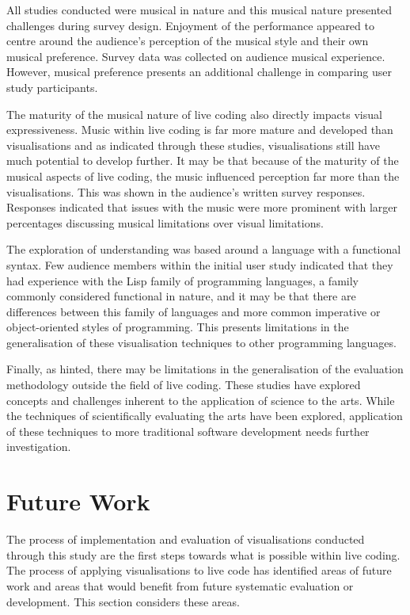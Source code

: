 All studies conducted were musical in nature and this musical nature presented challenges during survey design. Enjoyment of the performance appeared to centre around the audience's perception of the musical style and their own musical preference. Survey data was collected on audience musical experience. However, musical preference presents an additional challenge in comparing user study participants.

The maturity of the musical nature of live coding also directly impacts visual expressiveness. Music within live coding is far more mature and developed than visualisations and as indicated through these studies, visualisations still have much potential to develop further. It may be that because of the maturity of the musical aspects of live coding, the music influenced perception far more than the visualisations. This was shown in the audience's written survey responses. Responses indicated that issues with the music were more prominent with larger percentages discussing musical limitations over visual limitations.

The exploration of understanding was based around a language with a functional syntax. Few audience members within the initial user study indicated that they had experience with the Lisp family of programming languages, a family commonly considered functional in nature, and it may be that there are differences between this family of languages and more common imperative or object-oriented styles of programming. This presents limitations in the generalisation of these visualisation techniques to other programming languages.

Finally, as hinted, there may be limitations in the generalisation of the evaluation methodology outside the field of live coding. These studies have explored concepts and challenges inherent to the application of science to the arts. While the techniques of scientifically evaluating the arts have been explored, application of these techniques to more traditional software development needs further investigation.

\section{Future Work}

The process of implementation and evaluation of visualisations conducted through this study are the first steps towards what is possible within live coding. The process of applying visualisations to live code has identified areas of future work and areas that would benefit from future systematic evaluation or development. This section considers these areas. 

